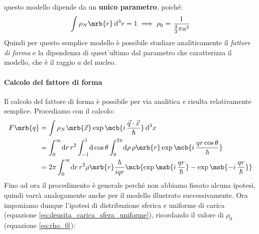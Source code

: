questo modello dipende da un \textbf{unico parametro}, poiché:
\begin{equation}
	\int \rho_N\mrb{r} \, \mathrm{d}^3r = 1 \implies \rho_0 =
	\frac{1}{\frac{4}{3}\pi a^3}
	\label{eq:rho_0}
\end{equation}
Quindi per questo semplice modello è possibile studiare analiticamente il
\textit{fattore di forma} e la dipendenza di quest'ultimo dal parametro che
caratterizza il modello, che è il raggio $a$ del nucleo.

\paragraph{Calcolo del fattore di forma}
Il calcolo del fattore di forma è possibile per via analitica e risulta
relativamente semplice. Procediamo con il calcolo:
\begin{equation}
	\begin{split}
		F\mrb{q} &= \int \rho_N\mrb{\vec{x}} \exp\mcb{i \,
			\frac{\vec{q}\cdot\vec{x}}{\hbar}} \, \mathrm{d}^3x
		\\
		&= \int_0^\infty \! \mathrm{d}r \, r^2 \int_{-1}^1 \! \mathrm{d}\cos\theta
		\int_0^{2\pi} \! \mathrm{d}\rho \, \rho\mrb{r} \exp\mcb{i \, \frac{qr
				\cos\theta}{\hbar}}
		\\
		&= 2\pi \int_0^\infty \! \mathrm{d}r \, r^2 \rho\mrb{r} \frac{\hbar}{iqr}
		\mcb{\exp\msb{i \, \frac{qr}{\hbar}} - \exp\msb{-i \, \frac{qr}{\hbar}}}
	\end{split}
\end{equation}
Fino ad ora il procedimento è generale perché non abbiamo fissato alcuna
ipotesi, quindi varrà analogamente anche per il modello illustrato
successivamente. Ora imponiamo dunque l'ipotesi di distribuzione sferica e
uniforme di carica (equazione \ref{eq:densita_carica_sfera_uniforme}),
ricordando il valore di $\rho_0$ (equazione \ref{eq:rho_0}):

